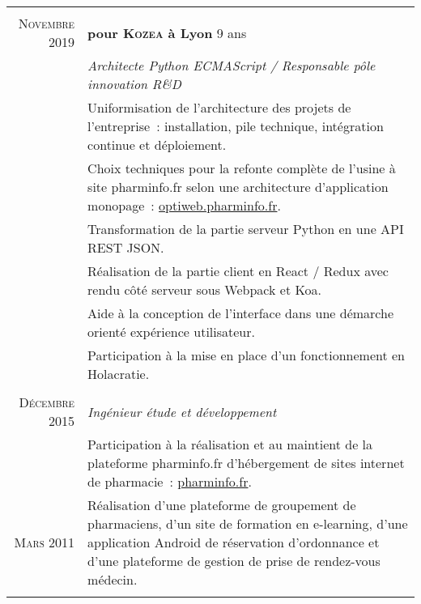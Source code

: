 \documentclass[a4paper,10pt]{article}
\begin{document}
  \begin{supertabular}{r|p{11cm}}
     \\
    \textsc{Novembre} 2019  & \textbf{pour \textsc{Kozea} à Lyon} \footnotesize{9 ans} \\
    & \emph{Architecte Python ECMAScript / Responsable pôle innovation R\&D} \\
    & \footnotesize{
      Uniformisation de l’architecture des projets de l’entreprise :
      installation, pile technique, intégration continue et déploiement.
    } \\
    & \footnotesize{
      Choix techniques pour la refonte complète de l’usine à site pharminfo.fr
      selon une architecture d’application monopage :
      \href{https://optiweb.pharminfo.fr}{optiweb.pharminfo.fr}.
    } \\
    & \footnotesize{
      Transformation de la partie serveur Python en une API REST JSON.
    } \\
    & \footnotesize{
      Réalisation de la partie client en React / Redux avec rendu côté serveur
      sous Webpack et Koa.
    } \\
    & \footnotesize{
      Aide à la conception de l’interface dans une démarche orienté expérience
      utilisateur.
    } \\
    & \footnotesize{
      Participation à la mise en place d’un fonctionnement en Holacratie.
    } \\
    \\
    \textsc{Décembre} 2015 & \emph{Ingénieur étude et développement} \\
    & \footnotesize{
      Participation à la réalisation et au maintient de la plateforme
      pharminfo.fr d’hébergement de sites internet de pharmacie :
      \href{https://www.pharminfo.fr}{pharminfo.fr}.
    } \\
     \footnotesize{\textsc{Mars} 2011}
    & \begin{minipage}[b]{0.85\textwidth}
      \footnotesize{
        Réalisation d'une plateforme de groupement de pharmaciens,
        d’un site de formation en e-learning,
        d'une application Android de réservation d’ordonnance et
        d'une plateforme de gestion de prise de rendez-vous médecin.
      }
    \end{minipage} \\

     \\


\end{supertabular}
\end{document}
